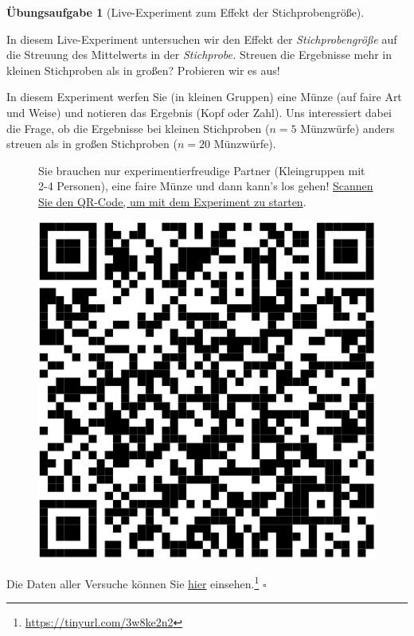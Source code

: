 \documentclass[
  letterpaper,
  twoside,
  open=any]{scrbook}
\theoremstyle{definition}
\newtheorem{exercise}{Übungsaufgabe}[chapter]
\theoremstyle{definition}
\theoremstyle{definition}
\theoremstyle{remark}
\begin{document}
\begin{exercise}[Live-Experiment zum Effekt der
Stichprobengröße]\protect\hypertarget{exr-kleine-grosse-stipro}{}\label{exr-kleine-grosse-stipro}

In diesem Live-Experiment untersuchen wir den Effekt der
\emph{Stichprobengröße} auf die Streuung des Mittelwerts in der
\emph{Stichprobe.} Streuen die Ergebnisse mehr in kleinen Stichproben
als in großen? Probieren wir es aus!

In diesem Experiment werfen Sie (in kleinen Gruppen) eine Münze (auf
faire Art und Weise) und notieren das Ergebnis (Kopf oder Zahl). Uns
interessiert dabei die Frage, ob die Ergebnisse bei kleinen Stichproben
(\(n=5\) Münzwürfe) anders streuen als in großen Stichproben (\(n=20\)
Münzwürfe).

\begin{figure}

\begin{minipage}{0.80\linewidth}
Sie brauchen nur experimentierfreudige Partner (Kleingruppen mit 2-4
Personen), eine faire Münze und dann kann's los gehen!
\href{https://docs.google.com/forms/d/e/1FAIpQLSeAwqNyZtyQwttq5JrQdQ2AO7w5vzcVDXjiejKnyFNxiWtEag/viewform?usp=sf_link}{Scannen
Sie den QR-Code, um mit dem Experiment zu starten}.\end{minipage}%
%
\begin{minipage}{0.20\linewidth}

\begin{center}
\includegraphics[width=0.75\linewidth,height=\textheight,keepaspectratio]{010-rahmen_files/figure-pdf/unnamed-chunk-17-1.pdf}
\end{center}

\end{minipage}%

\end{figure}%

Die Daten aller Versuche können Sie
\href{https://docs.google.com/spreadsheets/d/11mKFFpr-Y1CMPpq4dGA-JA_Z9jRkPbXolo54Y0G_2gE/edit?usp=sharing}{hier}
einsehen.\footnote{\url{https://tinyurl.com/3w8ke2n2}} \(\square\)

\end{exercise}
\end{document}
